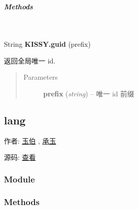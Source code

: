 \documentclass[letterpaper,10pt,english]{sphinxmanual}
\begin{document}
\subparagraph{Methods}
\label{api/seed/kissy/guid:methods}

\begin{fulllineitems}
\label{api/seed/kissy/guid:Seed.KISSY.guid}~
\begin{DUlineblock}{0em}
\item[] String \textbf{KISSY.guid} (prefix)
\item[] 返回全局唯一 id.
\end{DUlineblock}
\begin{quote}\begin{description}
\item[{Parameters}] \leavevmode
\textbf{prefix} (\emph{string}) -- 唯一 id 前缀

\end{description}\end{quote}

\end{fulllineitems}

\label{api/seed/lang/index:module-Lang}

\subsection{lang}
\label{api/seed/lang/index:lang}\label{api/seed/lang/index::doc}
\begin{DUlineblock}{0em}
\item[] 作者: \href{mailto:lifesinger@gmail.com}{玉伯} , \href{mailto:yiminghe@gmail.com}{承玉}
\item[] 源码: \href{https://github.com/kissyteam/kissy/tree/master/src/seed/lang.js}{查看}
\end{DUlineblock}


\subsubsection{Module}
\label{api/seed/lang/index:module}\begin{quote}

{\hyperref[api/seed/lang/index:module-Lang]{}}
\end{quote}


\subsubsection{Methods}
\label{api/seed/lang/index:methods}
\end{document}
